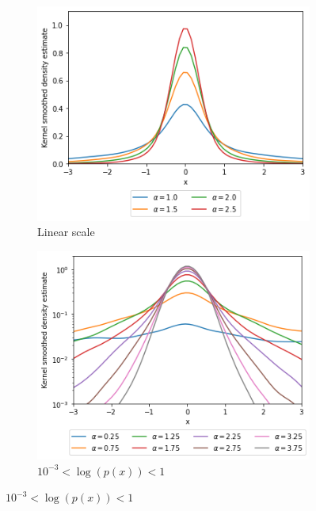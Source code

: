 \documentclass[a4paper]{article}
\begin{document}
\begin{figure}[h]
    \centering
    \begin{subfigure}[b]{0.3\textwidth}
        \centering
        \includegraphics[width=\textwidth]{figures/nonstandard_distribution_ksdensity.png}
        \caption{Linear scale}
        \label{fig:nonstandard_distribution_kernel_smoothed_linear}
    \end{subfigure}
    \hfill
    \begin{subfigure}[b]{0.3\textwidth}
        \centering
        \includegraphics[width=\textwidth]{figures/nonstandard_distribution_ksdensity_log_close.png}
        \caption{$10^{-3} < \log(p(x)) < 1$}
        \label{fig:nonstandard_distribution_ksdensity_log_close}

\end{subfigure}
\end{figure}
\end{document}
